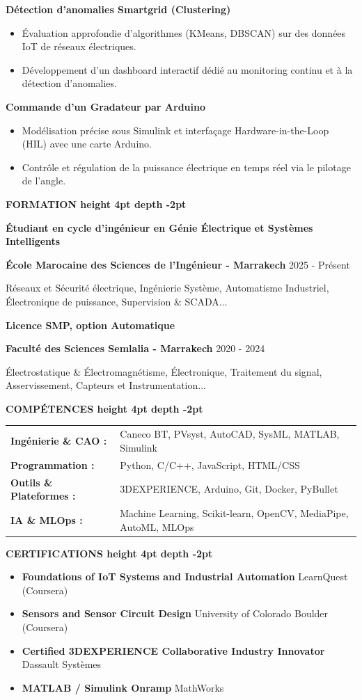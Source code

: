 \documentclass[10pt,a4paper]{altacv}
\renewcommand{\cvsection}[2][]{%
  \medskip%
  {\color{heading}\LARGE\bfseries #2 \hspace{0.2em}\leaders\vrule height 4pt depth -2pt\hfill\mbox{}}\par\smallskip
}
\renewcommand{\cvevent}[4]{%
  {\large\bfseries\color{accent}#1\par}
  \smallskip\normalsize
  \ifstrequal{#2}{}{}{%
    \textbf{\color{emphasis}#2\ifstrequal{#4}{}{}{ - #4}}%
  }%
  \hfill
  \ifstrequal{#3}{}{}{{\small#3}}%
  \par\smallskip
}
\begin{document}
{\large\bfseries\color{accent} Détection d'anomalies Smartgrid (Clustering)}\\[0.05cm]
\begin{itemize}
  \item Évaluation approfondie d'algorithmes (KMeans, DBSCAN) sur des données IoT de réseaux électriques.
  \item Développement d'un dashboard interactif dédié au monitoring continu et à la détection d'anomalies.
\end{itemize}

{\large\bfseries\color{accent} Commande d'un Gradateur par Arduino}\\[0.05cm]
\begin{itemize}
  \item Modélisation précise sous Simulink et interfaçage Hardware-in-the-Loop (HIL) avec une carte Arduino.
  \item Contrôle et régulation de la puissance électrique en temps réel via le pilotage de l'angle.
\end{itemize}


\cvsection{FORMATION}
\cvevent{Étudiant en cycle d'ingénieur en Génie Électrique et Systèmes Intelligents}{École Marocaine des Sciences de l'Ingénieur}{2025 - Présent}{Marrakech}
\small Réseaux et Sécurité électrique, Ingénierie Système, Automatisme Industriel, Électronique de puissance, Supervision \& SCADA...

\cvevent{Licence SMP, option Automatique}{Faculté des Sciences Semlalia}{2020 - 2024}{Marrakech}
\small Électrostatique \& Électromagnétisme, Électronique, Traitement du signal, Asservissement, Capteurs et Instrumentation...

\cvsection{COMPÉTENCES}
\begin{tabular}{@{}ll@{}}
\textbf{Ingénierie \& CAO :} & Caneco BT, PVsyst, AutoCAD, SysML, MATLAB, Simulink \\[1pt]
\textbf{Programmation :} & Python, C/C++, JavaScript, HTML/CSS \\[1pt]
\textbf{Outils \& Plateformes :} & 3DEXPERIENCE, Arduino, Git, Docker, PyBullet \\[1pt]
\textbf{IA \& MLOps :} & Machine Learning, Scikit-learn, OpenCV, MediaPipe, AutoML, MLOps \\
\end{tabular}

\cvsection{CERTIFICATIONS}
\begin{itemize}[leftmargin=*, label=\textbullet, itemsep=2pt]
  \item \textbf{Foundations of IoT Systems and Industrial Automation} \hfill {\color{emphasis}LearnQuest (Coursera)}
  \item \textbf{Sensors and Sensor Circuit Design} \hfill {\color{emphasis}University of Colorado Boulder (Coursera)}
  \item \textbf{Certified 3DEXPERIENCE Collaborative Industry Innovator} \hfill {\color{emphasis}Dassault Systèmes}
  \item \textbf{MATLAB / Simulink Onramp} \hfill {\color{emphasis}MathWorks}
\end{itemize}
\end{document}
